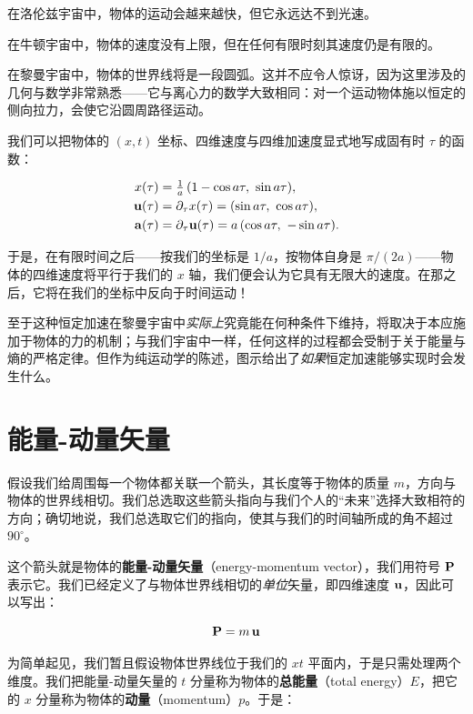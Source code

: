 在洛伦兹宇宙中，物体的运动会越来越快，但它永远达不到光速。

在牛顿宇宙中，物体的速度没有上限，但在任何有限时刻其速度仍是有限的。

在黎曼宇宙中，物体的世界线将是一段圆弧。这并不应令人惊讶，因为这里涉及的几何与数学非常熟悉——它与离心力的数学大致相同：对一个运动物体施以恒定的侧向拉力，会使它沿圆周路径运动。

我们可以把物体的 $(x,t)$ 坐标、四维速度与四维加速度显式地写成固有时 $\tau$ 的函数：

\begin{align}
x(\tau) &= \tfrac{1}{a}\,(1-\cos a\tau,\ \sin a\tau),\\
\bu(\tau) &= \partial_{\tau}x(\tau) = (\sin a\tau,\ \cos a\tau),\\
\mathbf{a}(\tau) &= \partial_{\tau}\bu(\tau) = a\,(\cos a\tau,\ -\sin a\tau).
\end{align}

于是，在有限时间之后——按我们的坐标是 $1/a$，按物体自身是 $\pi/(2a)$——物体的四维速度将平行于我们的 $x$ 轴，我们便会认为它具有无限大的速度。在那之后，它将在我们的坐标中反向于时间运动！

至于这种恒定加速在黎曼宇宙中\emph{实际上}究竟能在何种条件下维持，将取决于本应施加于物体的力的机制；与我们宇宙中一样，任何这样的过程都会受制于关于能量与熵的严格定律。但作为纯运动学的陈述，图示给出了\emph{如果}恒定加速能够实现时会发生什么。

\section{能量-动量矢量}

假设我们给周围每一个物体都关联一个箭头，其长度等于物体的质量 $m$，方向与物体的世界线相切。我们总选取这些箭头指向与我们个人的“未来”选择大致相符的方向；确切地说，我们总选取它们的指向，使其与我们的时间轴所成的角不超过 $90^\circ$。


这个箭头就是物体的\textbf{能量-动量矢量}（energy-momentum vector），我们用符号 $\mathbf{P}$ 表示它。我们已经定义了与物体世界线相切的\emph{单位}矢量，即四维速度 $\mathbf{u}$，因此可以写出：

\begin{equation}
\mathbf{P} = m\,\mathbf{u}
\end{equation}

为简单起见，我们暂且假设物体世界线位于我们的 $xt$ 平面内，于是只需处理两个维度。我们把能量-动量矢量的 $t$ 分量称为物体的\textbf{总能量}（total energy）$E$，把它的 $x$ 分量称为物体的\textbf{动量}（momentum）$p$。于是：

